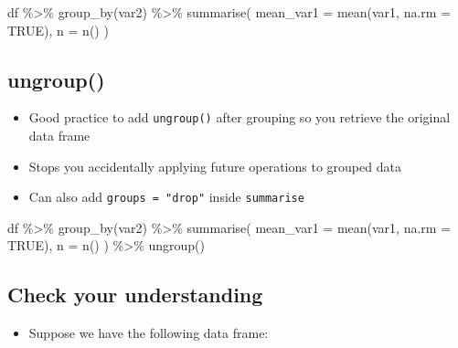 \documentclass[
  letterpaper,
  DIV=11,
  numbers=noendperiod]{scrartcl}
\newenvironment{Shaded}{\begin{snugshade}}{\end{snugshade}}
\newcommand{\AttributeTok}[1]{\textcolor[rgb]{0.40,0.45,0.13}{#1}}
\newcommand{\ConstantTok}[1]{\textcolor[rgb]{0.56,0.35,0.01}{#1}}
\newcommand{\FunctionTok}[1]{\textcolor[rgb]{0.28,0.35,0.67}{#1}}
\newcommand{\NormalTok}[1]{\textcolor[rgb]{0.00,0.23,0.31}{#1}}
\newcommand{\SpecialCharTok}[1]{\textcolor[rgb]{0.37,0.37,0.37}{#1}}
\providecommand{\tightlist}{%
  \setlength{\itemsep}{0pt}\setlength{\parskip}{0pt}}
\begin{document}
\begin{Shaded}
\begin{Highlighting}[]
\NormalTok{df }\SpecialCharTok{\%\textgreater{}\%}
  \FunctionTok{group\_by}\NormalTok{(var2) }\SpecialCharTok{\%\textgreater{}\%}
  \FunctionTok{summarise}\NormalTok{(}
    \AttributeTok{mean\_var1 =} \FunctionTok{mean}\NormalTok{(var1, }\AttributeTok{na.rm =} \ConstantTok{TRUE}\NormalTok{),}
    \AttributeTok{n =} \FunctionTok{n}\NormalTok{()}
\NormalTok{  )}
\end{Highlighting}
\end{Shaded}

\subsection{ungroup()}\label{ungroup}

\begin{itemize}
\tightlist
\item
  Good practice to add \texttt{ungroup()} after grouping so you retrieve
  the original data frame
\item
  Stops you accidentally applying future operations to grouped data
\item
  Can also add \texttt{groups\ =\ "drop"} inside \texttt{summarise}
\end{itemize}

\begin{Shaded}
\begin{Highlighting}[]
\NormalTok{df }\SpecialCharTok{\%\textgreater{}\%}
  \FunctionTok{group\_by}\NormalTok{(var2) }\SpecialCharTok{\%\textgreater{}\%}
  \FunctionTok{summarise}\NormalTok{(}
    \AttributeTok{mean\_var1 =} \FunctionTok{mean}\NormalTok{(var1, }\AttributeTok{na.rm =} \ConstantTok{TRUE}\NormalTok{),}
    \AttributeTok{n =} \FunctionTok{n}\NormalTok{()}
\NormalTok{  ) }\SpecialCharTok{\%\textgreater{}\%}
  \FunctionTok{ungroup}\NormalTok{()}
\end{Highlighting}
\end{Shaded}

\subsection{Check your understanding}\label{check-your-understanding}

\begin{itemize}
\tightlist
\item
  Suppose we have the following data frame:
\end{itemize}
\end{document}
